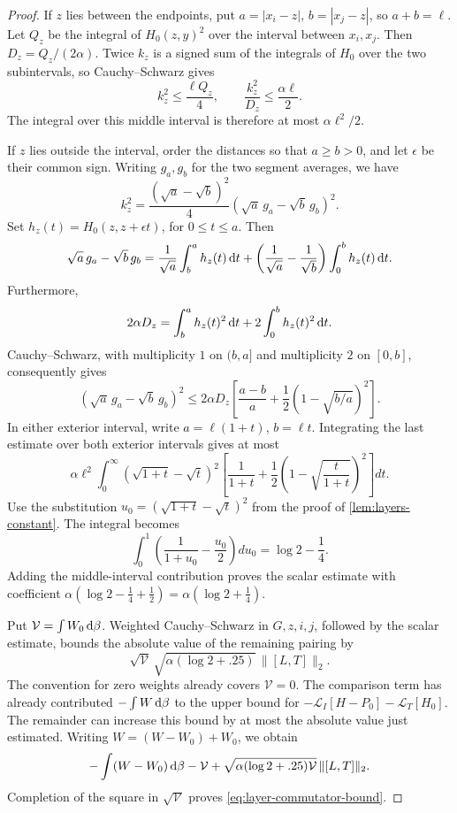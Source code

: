 \begin{proof}
If $z$ lies between the endpoints, put $a=|x_i-z|$, $b=|x_j-z|$, so $a+b=\ell$. Let $Q_z$ be the integral of $H_0(z,y)^2$ over the interval between $x_i,x_j$. Then $D_z=Q_z/(2\alpha)$. Twice $k_z$ is a signed sum of the integrals of $H_0$ over the two subintervals, so Cauchy--Schwarz gives
\[
 k_z^2\le\frac{\ell Q_z}{4},\qquad
 \frac{k_z^2}{D_z}\le\frac{\alpha\ell}{2}.
\]
The integral over this middle interval is therefore at most $\alpha\ell^2/2$.

If $z$ lies outside the interval, order the distances so that $a\ge b>0$, and let $\epsilon$ be their common sign. Writing $g_a,g_b$ for the two segment averages, we have
\[
 k_z^2
 =\frac{(\sqrt a-\sqrt b)^2}{4}
          (\sqrt a\,g_a-\sqrt b\,g_b)^2.
\]
Set $h_z(t)=H_0(z,z+\epsilon t)$, for $0\le t\le a$. Then
\[
 \sqrt a\,g_a-\sqrt b\,g_b
 =\frac1{\sqrt a}\int_b^a h_z(t)\,\mathrm{d} t
   +\left(\frac1{\sqrt a}-\frac1{\sqrt b}\right)
                         \int_0^b h_z(t)\,\mathrm{d} t.
\]
Furthermore,
\[
 2\alpha D_z
 =\int_b^a h_z(t)^2\,\mathrm{d} t+2\int_0^b h_z(t)^2\,\mathrm{d} t.
\]
Cauchy--Schwarz, with multiplicity $1$ on $(b,a]$ and multiplicity $2$ on $[0,b]$, consequently gives
\[
 (\sqrt a\,g_a-\sqrt b\,g_b)^2
 \le 2\alpha D_z
       \left[\frac{a-b}{a}
                    +\frac12(1-\sqrt{b/a})^2\right].
\]
In either exterior interval, write $a=\ell(1+t)$, $b=\ell t$.  Integrating the last estimate over both exterior intervals gives at most
\[
 \alpha\ell^2\int_0^\infty
  (\sqrt{1+t}-\sqrt t)^2
  \left[\frac1{1+t}
             +\frac12\left(1-\sqrt{\frac{t}{1+t}}\right)^2\right]dt.
\]
Use the substitution $u_0=(\sqrt{1+t}-\sqrt t)^2$ from the proof of \cref{lem:layers-constant}. The integral becomes
\[
 \int_0^1\left(\frac1{1+u_0}-\frac{u_0}{2}\right)du_0
 =\log2-\frac14.
\]
Adding the middle-interval contribution proves the scalar estimate with coefficient $\alpha(\log2-\tfrac14+\tfrac12) =\alpha(\log2+\tfrac14)$.

Put $\mathcal{V}=\int W_0\,\mathrm{d} \beta$. Weighted Cauchy--Schwarz in $G,z,i,j$, followed by the scalar estimate, bounds the absolute value of the remaining pairing by
\[
 \sqrt{\mathcal{V}}\,
 \sqrt{\alpha(\log2+.25)}\,\|[L,T]\|_2.
\]
The convention for zero weights already covers $\mathcal{V}=0$. The comparison term has already contributed $-\int W\,\mathrm{d} \beta$ to the upper bound for $-\mathcal{L}_I[H-P_0]-\mathcal{L}_T[H_0]$. The remainder can increase this bound by at most the absolute value just estimated. Writing $W=(W-W_0)+W_0$, we obtain
\[
 -\int(W-W_0)\,\mathrm{d} \beta
 -\mathcal{V}+\sqrt{\alpha(\log2+.25)\mathcal{V}}\,\|[L,T]\|_2.
\]
Completion of the square in $\sqrt{\mathcal{V}}$ proves \eqref{eq:layer-commutator-bound}.
\end{proof}

